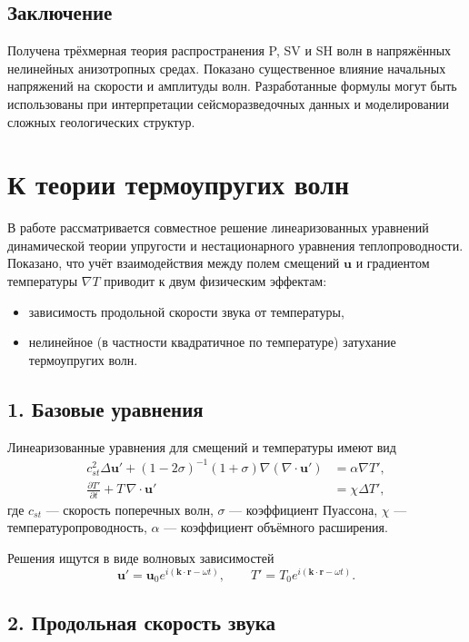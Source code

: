 \subsection*{Заключение}

Получена трёхмерная теория распространения P, SV и SH волн в напряжённых нелинейных анизотропных средах. Показано существенное влияние начальных напряжений на скорости и амплитуды волн. Разработанные формулы могут быть использованы при интерпретации сейсморазведочных данных и моделировании сложных геологических структур.


\section*{ К теории термоупругих волн}

В работе рассматривается совместное решение линеаризованных уравнений динамической теории упругости и нестационарного уравнения теплопроводности. Показано, что учёт взаимодействия между полем смещений $\mathbf{u}$ и градиентом температуры $\nabla T$ приводит к двум физическим эффектам:
\begin{itemize}
    \item зависимость продольной скорости звука от температуры,
    \item нелинейное (в частности квадратичное по температуре) затухание термоупругих волн.
\end{itemize}

\subsection*{1. Базовые уравнения}

Линеаризованные уравнения для смещений и температуры имеют вид
\begin{align}
    c_{st}^2 \Delta \mathbf{u}' + (1 - 2\sigma)^{-1}(1+\sigma)\nabla(\nabla\!\cdot\mathbf{u}') 
    &= \alpha \nabla T', \\
    \frac{\partial T'}{\partial t} + T \, \nabla\!\cdot\mathbf{u}' &= \chi \Delta T',
\end{align}
где $c_{st}$ — скорость поперечных волн, $\sigma$ — коэффициент Пуассона,  
$\chi$ — температуропроводность, $\alpha$ — коэффициент объёмного расширения.

Решения ищутся в виде волновых зависимостей
\[
\mathbf{u}' = \mathbf{u}_0 e^{i(\mathbf{k}\cdot\mathbf{r} - \omega t)}, 
\qquad
T' = T_0 e^{i(\mathbf{k}\cdot\mathbf{r} - \omega t)} .
\]

\subsection*{2. Продольная скорость звука}

